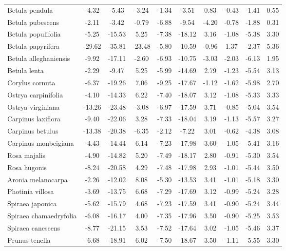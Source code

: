 \documentclass[11pt]{article}
\begin{document}
\begin{longtable}{p{1.50in}c{0.32in}c{0.32in}c{0.32in}c{0.32in}c{0.32in}c{0.32in}c{0.2in}c{0.3in}c{0.1in}}
  Betula pendula & -4.32 & -5.43 & -3.24 & -1.34 & -3.51 & 0.83 & -0.43 & -1.41 & 0.55 \\ 
  Betula pubescens & -2.11 & -3.42 & -0.79 & -6.88 & -9.54 & -4.20 & -0.78 & -1.88 & 0.31 \\ 
  Betula populifolia & -5.25 & -15.53 & 5.25 & -7.38 & -18.12 & 3.16 & -1.08 & -5.38 & 3.30 \\ 
  Betula papyrifera & -29.62 & -35.81 & -23.48 & -5.80 & -10.59 & -0.96 & 1.37 & -2.37 & 5.36 \\ 
  Betula alleghaniensis & -9.92 & -17.11 & -2.60 & -6.93 & -10.75 & -3.03 & -2.03 & -6.13 & 1.95 \\ 
  Betula lenta & -2.29 & -9.47 & 5.25 & -5.99 & -14.69 & 2.79 & -1.23 & -5.54 & 3.13 \\ 
  Corylus cornuta & -6.37 & -19.26 & 7.06 & -9.25 & -17.67 & -1.12 & -1.62 & -5.98 & 2.70 \\ 
  Ostrya carpinifolia & -4.10 & -14.33 & 6.22 & -7.40 & -18.07 & 3.12 & -1.08 & -5.33 & 3.33 \\ 
  Ostrya virginiana & -13.26 & -23.48 & -3.08 & -6.97 & -17.59 & 3.71 & -0.85 & -5.04 & 3.54 \\ 
  Carpinus laxiflora & -9.40 & -22.06 & 3.28 & -7.33 & -18.04 & 3.19 & -1.13 & -5.57 & 3.27 \\ 
  Carpinus betulus & -13.38 & -20.38 & -6.35 & -2.12 & -7.22 & 3.01 & -0.62 & -4.38 & 3.08 \\ 
  Carpinus monbeigiana & -4.43 & -14.44 & 6.14 & -7.23 & -17.98 & 3.60 & -1.05 & -5.41 & 3.16 \\ 
  Rosa majalis & -4.90 & -14.82 & 5.20 & -7.49 & -18.17 & 2.80 & -0.91 & -5.30 & 3.54 \\ 
  Rosa hugonis & -8.24 & -20.58 & 4.29 & -7.48 & -17.98 & 2.93 & -1.01 & -5.44 & 3.50 \\ 
  Aronia melanocarpa & -2.26 & -12.02 & 8.08 & -5.30 & -13.53 & 3.41 & -1.01 & -5.18 & 3.30 \\ 
  Photinia villosa & -3.69 & -13.75 & 6.68 & -7.29 & -17.69 & 3.12 & -0.99 & -5.24 & 3.28 \\ 
  Spiraea japonica & -5.62 & -15.79 & 4.68 & -7.23 & -17.59 & 3.41 & -0.90 & -5.24 & 3.44 \\ 
  Spiraea chamaedryfolia & -6.08 & -16.17 & 4.00 & -7.35 & -17.96 & 3.50 & -0.90 & -5.25 & 3.53 \\ 
  Spiraea canescens & -8.77 & -21.15 & 3.53 & -7.52 & -17.64 & 3.02 & -1.05 & -5.46 & 3.37 \\ 
  Prunus tenella & -6.68 & -18.91 & 6.02 & -7.50 & -18.67 & 3.50 & -1.11 & -5.55 & 3.30 \\ 

\end{longtable}
\end{document}
